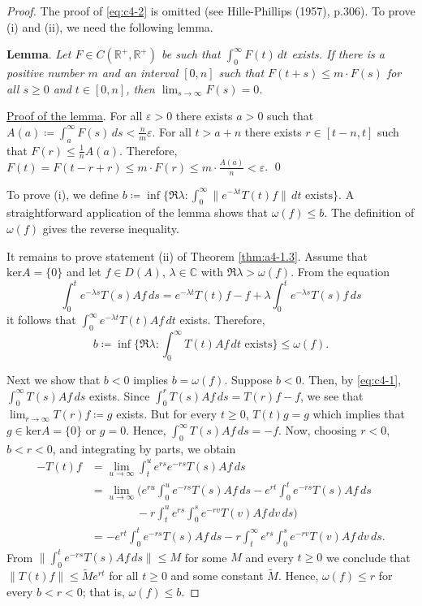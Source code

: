 \begin{proof}  The proof of \eqref{eq:c4-2} is omitted (see Hille-Phillips (1957), p.306). 
To prove (i) and (ii), we need the following lemma.

\bigskip
\noindent
{\bf Lemma}. 
\label{lem:a4-1.3}
{\it Let $F \in C(\mathbb{R}^{+},\mathbb{R}^{+})$ be such that $\int_{0}^{\infty} F(t) \, dt$ exists. 
If there is a positive number $m$ and an interval $[0,n]$ such that $F(t + s) \leq m \cdot F(s)$ for all $s \geq 0$ and $t \in [0,n]$, then $\lim_{s \to \infty} F(s) = 0$.}


\medskip
\noindent
\underline{Proof of the lemma}. 
For all $\varepsilon > 0$ there exists $a > 0$ such that $A(a) \coloneqq \int_{a}^{\infty} F(s) \, ds < \frac{n}{m}\varepsilon$.
For all $t > a+n$ there exists $r \in [t-n,t]$ such that $F(r) \leq \frac{1}{n}A(a)$.
Therefore, $F(t) = F(t-r+r) \leq m \cdot F(r) \leq m \cdot \frac{A(a)}{n} < \varepsilon$. 
\qed

\bigskip
\noindent
To prove (i), we define $b \coloneqq \inf\{\Re \lambda : \int_{0}^{\infty} \|e^{-\lambda t} T(t)f\| \, dt \text{ exists}\}$. 
A straightforward application of the lemma shows that $\omega(f) \leq b$.
The definition of $\omega(f)$ gives the reverse inequality.

\goodbreak
\medskip
\noindent
It remains to prove statement (ii) of Theorem \ref{thm:a4-1.3}.
Assume that $\text{ker} A = \{0\}$ and let $f \in D(A)$, $\lambda \in \mathbb{C}$ with $\Re \lambda > \omega(f)$. 
From the equation
\[
\int_{0}^{t} e^{-\lambda s} T(s)Af \, ds = e^{-\lambda t}T(t)f - f + \lambda \int_{0}^{t} e^{-\lambda s} T(s)f \, ds
\]
it follows that $\int_{0}^{\infty} e^{-\lambda t} T(t)Af \, dt$ exists. 
Therefore, 
\[b \coloneqq \inf\{\Re \lambda : \int_{0}^{\infty} T(t)Af \, dt \text{ exists}\} \leq \omega(f).\]

\noindent
Next we show that $b < 0$ implies $b = \omega(f)$. 
Suppose $b < 0$. 
Then, by \eqref{eq:c4-1}, $\int_{0}^{\infty} T(s)Af \, ds$ exists. 
Since $\int_{0}^{r} T(s)Af \, ds = T(r)f - f$, we see that $\lim_{r \to \infty} T(r)f \coloneqq g$ exists. 
But for every $t \geq 0$, $T(t)g = g$ which implies that $g \in \text{ker} A = \{0\}$ or $g = 0$. 
Hence, $\int_{0}^{\infty} T(s)Af \, ds = -f$.
Now, choosing $r < 0$, $b < r < 0$, and integrating by parts, we obtain
\begin{align*}
-T(t)f &= \lim_{u \to \infty} \int_{t}^{u} e^{r s} e^{-r s} T(s)Af \, ds\\
&= \lim_{u \to \infty} ( e^{ru}\int_0^ue^{-rs} T(s)Af \, ds - e^{rt}\int_0^te^{-rs} T(s)Af \, ds\\ 
& \qquad \qquad -r\int_t^u e^{rs}\int_0^s e^{-rv} T(v)Af\, dv \, ds
) \\
&= - e^{rt}\int_0^te^{-rs} T(s)Af \, ds -r\int_t^\infty e^{rs}\int_0^s e^{-rv} T(v)Af\, dv \, ds.
\end{align*}
From $\|\int_{0}^{t} e^{-r s} T(s)Af \, ds\| \leq M$ for some $M$ and every $t \geq 0$ we conclude that $\|T(t)f\| \leq \tilde{M}e^{rt}$ for all $t \geq 0$ and some constant $\tilde{M}$.
Hence, $\omega(f) \leq r$ for every $b < r < 0$; that is, $\omega(f) \leq b$.


\end{proof}
